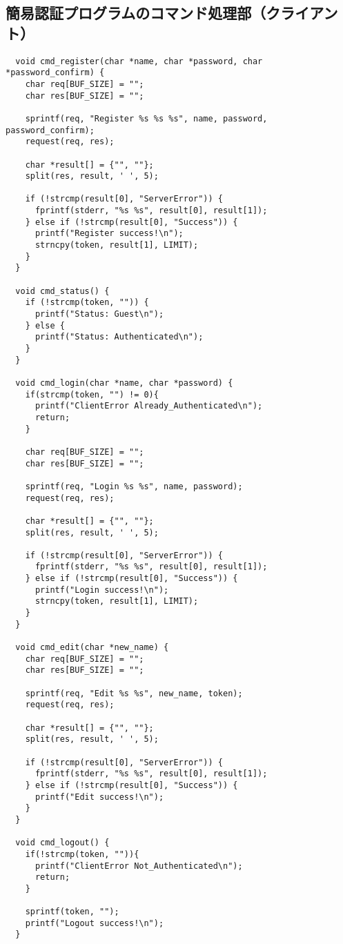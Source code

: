 \documentclass[11pt]{jsarticle}
\begin{document}
\subsection{簡易認証プログラムのコマンド処理部（クライアント）} \label{sec:auth_commands_client.c}

\begin{verbatim}
  void cmd_register(char *name, char *password, char *password_confirm) {
    char req[BUF_SIZE] = "";
    char res[BUF_SIZE] = "";
  
    sprintf(req, "Register %s %s %s", name, password, password_confirm);
    request(req, res);
  
    char *result[] = {"", ""};
    split(res, result, ' ', 5);
  
    if (!strcmp(result[0], "ServerError")) {
      fprintf(stderr, "%s %s", result[0], result[1]);
    } else if (!strcmp(result[0], "Success")) {
      printf("Register success!\n");
      strncpy(token, result[1], LIMIT);
    }
  }
  
  void cmd_status() {
    if (!strcmp(token, "")) {
      printf("Status: Guest\n");
    } else {
      printf("Status: Authenticated\n");
    }
  }
  
  void cmd_login(char *name, char *password) {
    if(strcmp(token, "") != 0){
      printf("ClientError Already_Authenticated\n");
      return;
    }
  
    char req[BUF_SIZE] = "";
    char res[BUF_SIZE] = "";
  
    sprintf(req, "Login %s %s", name, password);
    request(req, res);
  
    char *result[] = {"", ""};
    split(res, result, ' ', 5);
  
    if (!strcmp(result[0], "ServerError")) {
      fprintf(stderr, "%s %s", result[0], result[1]);
    } else if (!strcmp(result[0], "Success")) {
      printf("Login success!\n");
      strncpy(token, result[1], LIMIT);
    }
  }
  
  void cmd_edit(char *new_name) {
    char req[BUF_SIZE] = "";
    char res[BUF_SIZE] = "";
  
    sprintf(req, "Edit %s %s", new_name, token);
    request(req, res);
  
    char *result[] = {"", ""};
    split(res, result, ' ', 5);
  
    if (!strcmp(result[0], "ServerError")) {
      fprintf(stderr, "%s %s", result[0], result[1]);
    } else if (!strcmp(result[0], "Success")) {
      printf("Edit success!\n");
    }
  }
  
  void cmd_logout() {
    if(!strcmp(token, "")){
      printf("ClientError Not_Authenticated\n");
      return;
    }
  
    sprintf(token, "");
    printf("Logout success!\n");
  }
\end{verbatim}
\end{document}
